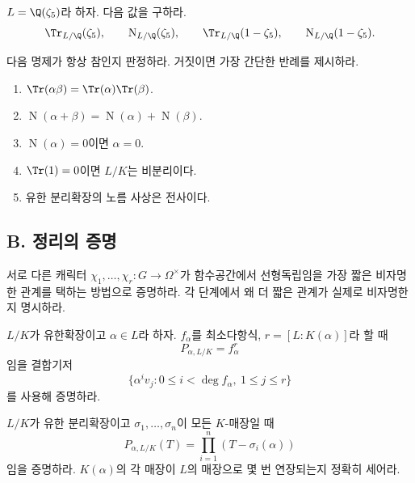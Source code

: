 \begin{exercise}[*]
\label{ex:cyclotomic-zeta5-norm-trace}
$L=\Q(\zeta_5)$라 하자. 다음 값을 구하라.
\[
  \Tr_{L/\Q}(\zeta_5),
  \qquad
  \operatorname N_{L/\Q}(\zeta_5),
  \qquad
  \Tr_{L/\Q}(1-\zeta_5),
  \qquad
  \operatorname N_{L/\Q}(1-\zeta_5).
\]
\end{exercise}

\begin{exercise}
다음 명제가 항상 참인지 판정하라. 거짓이면 가장 간단한 반례를 제시하라.
\begin{enumerate}[label=(\alph*)]
  \item $\Tr(\alpha\beta)=\Tr(\alpha)\Tr(\beta)$.
  \item $\operatorname N(\alpha+\beta)=\operatorname N(\alpha)+\operatorname N(\beta)$.
  \item $\operatorname N(\alpha)=0$이면 $\alpha=0$.
  \item $\Tr(1)=0$이면 $L/K$는 비분리이다.
  \item 유한 분리확장의 노름 사상은 전사이다.
\end{enumerate}
\end{exercise}

\subsection*{B. 정리의 증명}

\begin{exercise}[*]
\label{ex:prove-artin-independence}
서로 다른 캐릭터 $\chi_1,\dots,\chi_r:G\to\Omega^\times$가 함수공간에서 선형독립임을 가장 짧은 비자명한 관계를 택하는 방법으로 증명하라. 각 단계에서 왜 더 짧은 관계가 실제로 비자명한지 명시하라.
\end{exercise}

\begin{exercise}
$L/K$가 유한확장이고 $\alpha\in L$라 하자. $f_\alpha$를 최소다항식, $r=[L:K(\alpha)]$라 할 때
\[
  P_{\alpha,L/K}=f_\alpha^r
\]
임을 결합기저
\[
  \{\alpha^iv_j:0\le i<\deg f_\alpha,\ 1\le j\le r\}
\]
를 사용해 증명하라.
\end{exercise}

\begin{exercise}[*]
\label{ex:prove-embedding-formulas}
$L/K$가 유한 분리확장이고 $\sigma_1,\dots,\sigma_n$이 모든 $K$-매장일 때
\[
  P_{\alpha,L/K}(T)
  =\prod_{i=1}^n(T-\sigma_i(\alpha))
\]
임을 증명하라. $K(\alpha)$의 각 매장이 $L$의 매장으로 몇 번 연장되는지 정확히 세어라.
\end{exercise}

